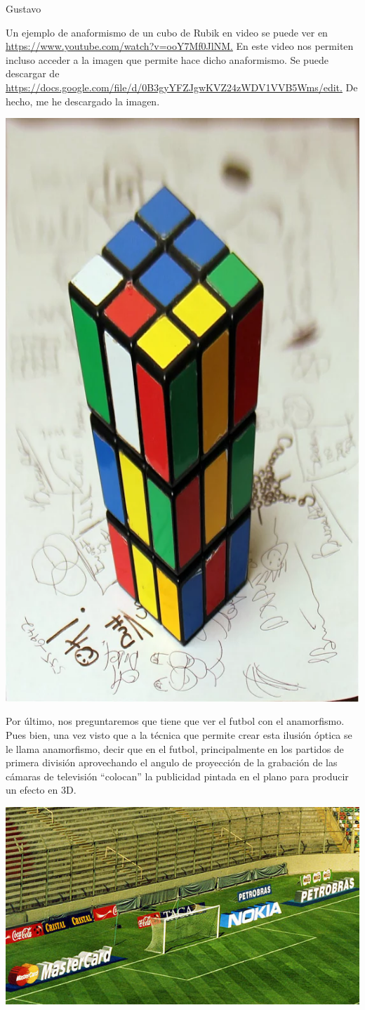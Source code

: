 \begin{opin}{\guscolor}{Gustavo}
\begin{leftbar}{\guscolor}
\begin{minipage}[h]{1\linewidth}
\end{minipage}
 
Un ejemplo de anaformismo de un cubo de Rubik en video se puede ver en  \url{https://www.youtube.com/watch?v=ooY7Mf0JlNM.} En este video nos permiten incluso acceder a la imagen que permite hace dicho anaformismo. Se puede descargar de \url{https://docs.google.com/file/d/0B3gyYFZJgwKVZ24zWDV1VVB5Wms/edit.} De hecho, me he descargado la imagen.

\begin{minipage}[h]{1\linewidth}
	\centering
	\includegraphics[width=0.45\linewidth]{img/anamorf3.png}
\end{minipage}
 
Por último, nos preguntaremos que tiene que ver el futbol con el anamorfismo. Pues bien, una vez visto que a la técnica que permite crear esta ilusión óptica se le llama anamorfismo, decir que en el futbol, principalmente en los partidos de primera división aprovechando el angulo de proyección de la grabación de las cámaras de televisión “colocan” la publicidad pintada en el plano para producir un efecto en 3D.

\begin{minipage}[h]{1\linewidth}
	\centering
	\includegraphics[width=0.7\linewidth]{img/anamorf4.jpg}
\end{minipage}
 

\end{leftbar}
\end{opin}
